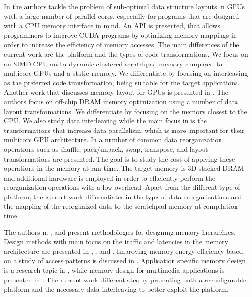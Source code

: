 \documentclass[prodmode,acmtecs]{acmsmall}
\begin{document}
In \cite{dymaxion} the authors tackle the problem of sub-optimal data structure layouts in GPUs with a large number of parallel cores, especially for programs that are designed with a CPU memory interface in mind. 
An API is presented, that allows programmers to improve CUDA programs by optimizing memory mappings in order to increase the efficiency of memory accesses. 
The main differences of the current work are the platform and the types of code transformations. 
We focus on an SIMD CPU and a dynamic clustered scratchpad memory compared to multicore GPUs and a static memory. 
We differentiate by focusing on interleaving as the preferred code transformation, being suitable for the target applications.
Another work that discusses memory layout for GPUs is presented in \cite{DL}.
The authors focus on off-chip DRAM memory optimization using a number of data layout transformations. 
We differentiate by focusing on the memory closest to the CPU. We also study data interleaving while the main focus in \cite{DL} is the transformations that increase data parallelism, which is more important for their multicore GPU architecture.
In \cite{3D} a number of common data reorganization operations such as shuffle, pack/unpack, swap, transpose, and layout transformations are presented. 
The goal is to study the cost of applying these operations in the memory at run-time. The target memory is 3D-stacked DRAM and additional hardware is employed in order to efficiently perform the reorganization operations with a low overhead. 
Apart from the different type of platform, the current work differentiates in the type of data reorganizations and the mapping of the reorganized data to the scratchpad memory at compilation time. 

The authors in \cite{abraham1999automatic}, \cite{jacob1996analytical} and \cite{li1999hardware} present methodologies for designing memory hierarchies.
Design methods with main focus on the traffic and latencies in the memory architecture are presented in \cite{chen1999loop}, \cite{grun2000mist}, \cite{jantsch1994hardware} and \cite{passes1995multi}.
Improving memory energy efficiency based on a study of access patterns is discussed in \cite{kandemir2001improving}.
Application specific memory design is a research topic in \cite{schmit1997synthesis}, while memory design for multimedia applications is presented in \cite{oshima1997high}.
The current work differentiates by presenting both a reconfigurable platform and the necessary data interleaving to better exploit the platform.
\end{document}
